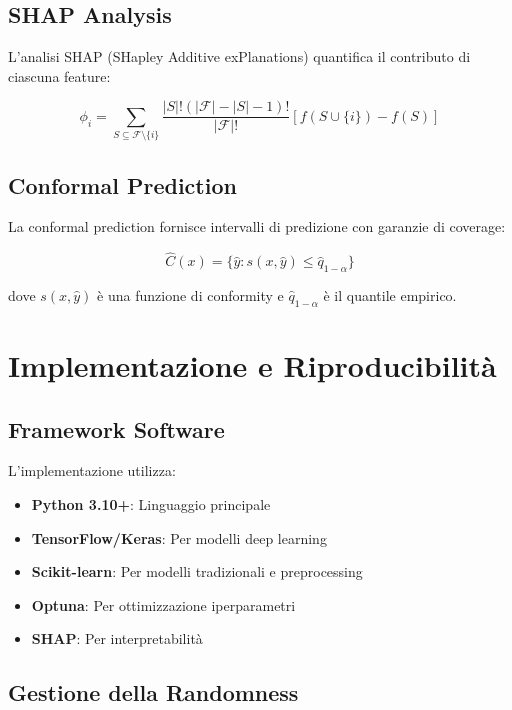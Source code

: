 \documentclass[12pt,a4paper,twoside]{report}
\begin{document}
\subsection{SHAP Analysis}

L'analisi SHAP (SHapley Additive exPlanations) quantifica il contributo di ciascuna feature:

\begin{equation}
\phi_i = \sum_{S \subseteq \mathcal{F} \setminus \{i\}} \frac{|S|!(|\mathcal{F}| - |S| - 1)!}{|\mathcal{F}|!} [f(S \cup \{i\}) - f(S)]
\end{equation}

\subsection{Conformal Prediction}

La conformal prediction fornisce intervalli di predizione con garanzie di coverage:

\begin{equation}
\hat{C}(x) = \{\hat{y} : s(x, \hat{y}) \leq \hat{q}_{1-\alpha}\}
\end{equation}

dove $s(x, \hat{y})$ è una funzione di conformity e $\hat{q}_{1-\alpha}$ è il quantile empirico.

\section{Implementazione e Riproducibilità}

\subsection{Framework Software}

L'implementazione utilizza:

\begin{itemize}
    \item \textbf{Python 3.10+}: Linguaggio principale
    \item \textbf{TensorFlow/Keras}: Per modelli deep learning
    \item \textbf{Scikit-learn}: Per modelli tradizionali e preprocessing
    \item \textbf{Optuna}: Per ottimizzazione iperparametri
    \item \textbf{SHAP}: Per interpretabilità
\end{itemize}

\subsection{Gestione della Randomness}
\end{document}
